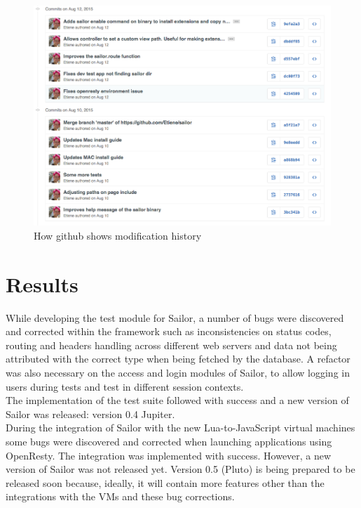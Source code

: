 \documentclass{article}
\begin{document}
\begin{figure}[h]
\centering\includegraphics[scale=0.5]{github.png}
\caption{\label{fig:github} How github shows modification history}
\end{figure}

\clearpage
\newpage

\section{Results}

While developing the test module for Sailor, a number of bugs were discovered and corrected within the framework such as inconsistencies on status codes, routing and headers handling across different web servers and data not being attributed with the correct type when being fetched by the database. A refactor was also necessary on the access and login modules of Sailor, to allow logging in users during tests and test in different session contexts.\\

The implementation of the test suite followed with success and a new version of Sailor was released: version 0.4 Jupiter.  \\

During the integration of Sailor with the new Lua-to-JavaScript virtual machines some bugs were discovered and corrected when launching applications using OpenResty. The integration was implemented with success. However, a new version of Sailor was not released yet. Version 0.5 (Pluto) is being prepared to be released soon because, ideally, it will contain more features other than the integrations with the VMs and these bug corrections.\\
\end{document}
